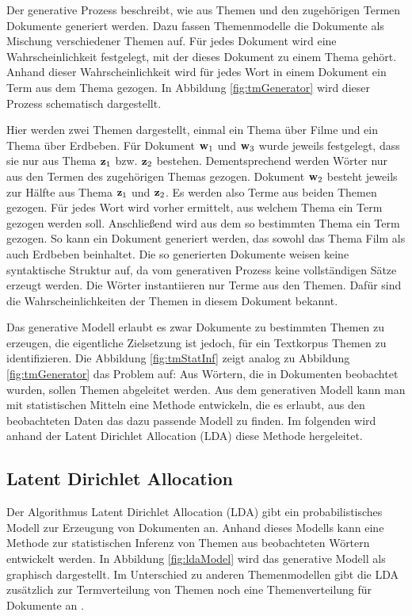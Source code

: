 Der generative Prozess beschreibt, wie aus Themen und den zugehörigen Termen Dokumente generiert werden. Dazu fassen Themenmodelle die Dokumente als Mischung verschiedener Themen auf. Für jedes Dokument wird eine Wahrscheinlichkeit festgelegt, mit der dieses Dokument zu einem Thema gehört. Anhand dieser Wahrscheinlichkeit wird für jedes Wort in einem Dokument ein Term aus dem Thema gezogen. In Abbildung \ref{fig:tmGenerator} wird dieser Prozess schematisch dargestellt. 

Hier werden zwei Themen dargestellt, einmal ein Thema über Filme und ein Thema über Erdbeben. Für Dokument $\mathbf{w}_1$ und $\mathbf{w}_3$ wurde jeweils festgelegt, dass sie nur aus Thema $\mathbf{z}_1$ bzw. $\mathbf{z}_2$ bestehen. Dementsprechend werden Wörter nur aus den Termen des zugehörigen Themas gezogen. Dokument $\mathbf{w}_2$ besteht jeweils zur Hälfte aus Thema $\mathbf{z}_1$ und $\mathbf{z}_2$. Es werden also Terme aus beiden Themen gezogen. Für jedes Wort wird vorher ermittelt, aus welchem Thema ein Term gezogen werden soll. Anschließend wird aus dem so bestimmten Thema ein Term gezogen. So kann ein Dokument generiert werden, das sowohl das Thema Film als auch Erdbeben beinhaltet. Die so generierten Dokumente weisen keine syntaktische Struktur auf, da vom generativen Prozess keine vollständigen Sätze erzeugt werden. Die Wörter instantiieren nur Terme aus den Themen. Dafür sind die Wahrscheinlichkeiten der Themen in diesem Dokument bekannt.

Das generative Modell erlaubt es zwar Dokumente zu bestimmten Themen zu erzeugen, die eigentliche Zielsetzung ist jedoch, für ein Textkorpus Themen zu identifizieren. Die Abbildung \ref{fig:tmStatInf} zeigt analog zu Abbildung \ref{fig:tmGenerator} das Problem auf: Aus Wörtern, die in Dokumenten beobachtet wurden, sollen Themen abgeleitet werden. 
Aus dem generativen Modell kann man mit statistischen Mitteln eine Methode entwickeln, die es erlaubt, aus den beobachteten Daten das dazu passende Modell zu finden. Im folgenden wird anhand der Latent Dirichlet Allocation (LDA) diese Methode hergeleitet. 

\subsection{Latent Dirichlet Allocation}

Der Algorithmus Latent Dirichlet Allocation (LDA) gibt ein probabilistisches Modell zur Erzeugung von Dokumenten an. Anhand dieses Modells kann eine Methode zur statistischen Inferenz von Themen aus beobachteten Wörtern entwickelt werden. In Abbildung \ref{fig:ldaModel} wird das generative Modell als graphisch dargestellt. Im Unterschied zu anderen Themenmodellen gibt die LDA zusätzlich zur Termverteilung von Themen noch eine Themenverteilung für Dokumente an \citep{Hofmann1999}. 

